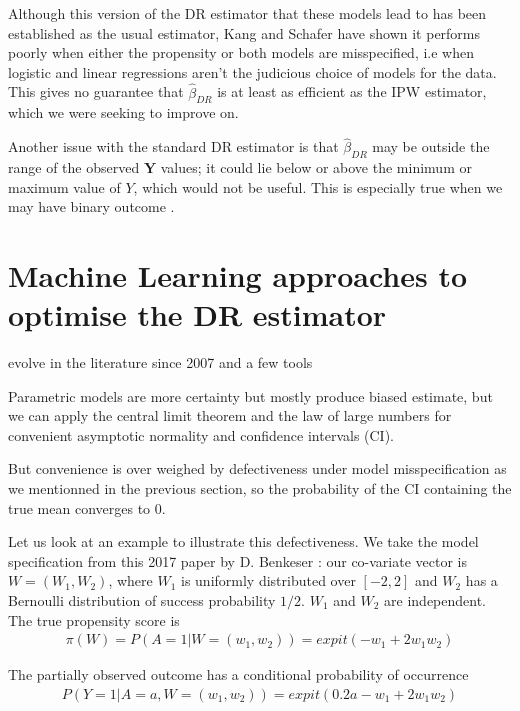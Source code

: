 \documentclass[12pt,twoside]{article}
\begin{document}
Although this version of the DR estimator that these models lead to has been established as the usual estimator, Kang and Schafer \cite{kang} have shown it performs poorly when either the propensity or both models are misspecified, i.e when logistic and linear regressions aren't the judicious choice of models for the data. This gives no guarantee that $\hat\beta_{DR}$ is at least as efficient as the IPW estimator, which we were seeking to improve on.

Another issue with the standard DR estimator is that $\hat\beta_{DR}$ may be outside the range of the observed $\mathbf{Y}$ values; it could lie below or above the minimum or maximum value of $Y$, which would not be useful. This is especially true when we may have binary outcome \cite{vansteelandt}.

\section{Machine Learning approaches to optimise the DR estimator}

evolve in the literature since 2007
and a few tools

\cite{diaz}

Parametric models are more certainty but mostly produce biased estimate, but we can apply the central limit theorem and the law of large numbers for convenient asymptotic normality and confidence intervals (CI).

But convenience is over weighed by defectiveness under model misspecification as we mentionned in the previous section, so the probability of the CI containing the true mean converges to 0. 

Let us look at an example to illustrate this defectiveness. We take the model specification from this 2017 paper by D. Benkeser \cite{benkeser2017}: our co-variate vector is $W = (W_1, W_2)$, where $W_1$ is uniformly distributed over $[-2,2]$ and $W_2$ has a Bernoulli distribution of success probability $1/2$. $W_1$ and $W_2$ are independent. The true propensity score is 
\begin{align*}
    \pi(W) = P(A = 1 |W = (w_1,w_2)) = expit(-w_1 + 2w_1w_2)
\end{align*}

The partially observed outcome has a conditional probability of occurrence 
\begin{align*}
    P(Y = 1|A = a,W = (w_1, w_2)) = expit(0.2a - w_1 + 2w_1w_2)
\end{align*}
\end{document}
